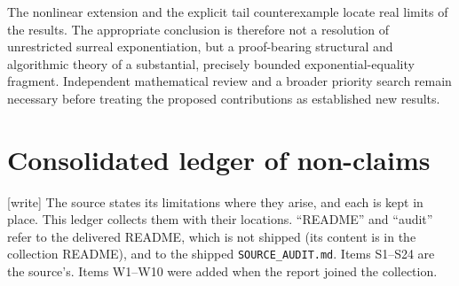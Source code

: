 \documentclass[11pt,letterpaper]{article}
\numberwithin{equation}{section}
\theoremstyle{definition}
\theoremstyle{remark}
\newcommand{\rpath}[1]{\nolinkurl{#1}}%
\newcommand{\wtag}{\textup{[write]}}%
\begin{document}
The nonlinear extension and the explicit tail counterexample locate real limits
of the results. The appropriate conclusion is therefore not a resolution of
unrestricted surreal exponentiation, but a proof-bearing structural and
algorithmic theory of a substantial, precisely bounded exponential-equality
fragment. Independent mathematical review and a broader priority search remain
necessary before treating the proposed contributions as established new results.

\section{Consolidated ledger of non-claims}\label{exr:sec:nonclaims}

\wtag{} The source states its limitations where they arise, and each is
kept in place. This ledger collects them with their locations. ``README''
and ``audit'' refer to the delivered README, which is not shipped (its content
is in the collection README), and to the shipped \rpath{SOURCE_AUDIT.md}.
Items S1--S24 are the source's. Items W1--W10 were added when the report
joined the collection.
\end{document}
